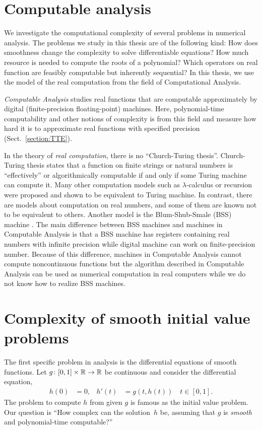 
\section{Computable analysis}

We investigate the computational complexity of several problems in 
numerical analysis.
The problems we study in this thesis are of the following kind:
How does smoothness change the complexity to solve differentiable equations?
How much resource is needed to compute the roots of a polynomial?
Which operators on real function are feasibly computable but inherently sequential?
In this thesis, we use the model of the real computation from the field of 
Computational Analysis.

\emph{Computable Analysis} 
\cite{ko1991complexity,weihrauch00:_comput_analy}
studies real functions that are computable approximately 
by digital (finite-precision floating-point) machines.
Here, polynomial-time computability and other notions of complexity 
is from this field and measure how hard it is to approximate real functions
with specified precision  (Sect.~\ref{section:TTE}). 

In the theory of \emph{real computation}, 
there is no ``Church-Turing thesis''.
Church-Turing thesis states that a function on finite strings or natural 
numbers is ``effectively'' or algorithmically computable 
if and only if some Turing machine can compute it.
Many other computation models such as $\lambda$-calculus or recursion
were proposed and shown to be equivalent to Turing machine.
In contrast, there are models about computation on real numbers, 
and some of them are known not to be equivalent to others.
Another model is the Blum-Shub-Smale (BSS) machine \cite{blum1988theory}.
The main difference between BSS machines and machines in Computable Analysis is
that a BSS machine has registers containing real numbers with infinite precision
while digital machine can work on finite-precision number.
Because of this difference,
machines in Computable Analysis cannot compute noncontinuous functions
but the algorithm described in Computable Analysis 
can be used as numerical computation in real computers
 while we do not know
how to realize BSS machines.


\section{Complexity of smooth initial value problems}
The first specific problem in analysis is the differential equations
of smooth functions.
Let $g \colon [0,1] \times \mathbb R \to \mathbb R$ be continuous 
and consider the differential equation,
\begin{align}
 \label{eq:ode}
 h(0) & = 0, &
 h'(t) & = g(t,h(t)) \quad t \in [0,1].
\end{align}
The problem to compute $h$ from given $g$
is famous as the initial value problem.
Our question is ``How complex can the solution~$h$ be, 
assuming that $g$ is \emph{smooth} and polynomial-time computable?''


